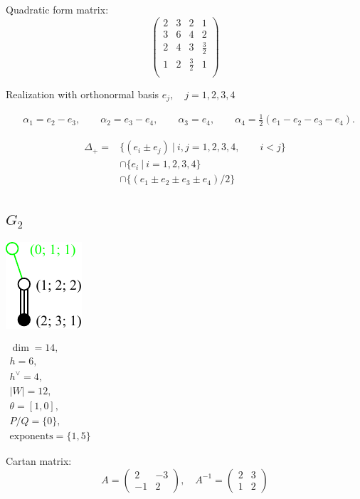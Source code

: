 \documentclass[12pt]{article}
\newcommand{\hc}{h^{\vee}}
\begin{document}
Quadratic form matrix:
\[
\left(
\begin{array}{cccc}
 2& 3 & 2& 1\\
 3 & 6& 4&2 \\
 2 & 4 & 3 & \frac32 \\
 1 &2  & \frac32 &1 \\
\end{array}
\right)
\]

Realization with orthonormal basis $e_j,\quad j=1,2,3,4$

\begin{align*}
  &\alpha_1=e_2-e_3,\qquad
  \alpha_2=e_3-e_4,\qquad
  \alpha_3=e_4,\qquad
  \alpha_4=\frac12(e_1-e_2-e_3-e_4).
\end{align*}

\begin{align*}
 \Delta_{+}=&\{(e_i \pm e_j)\ |\ i,j=1,2,3,4,\qquad i<j\} \\
      &\cap
       \{ e_{i}\ |\ i=1,2,3,4\}\\
      &\cap
       \{ (e_{1}\pm e_2 \pm e_3 \pm e_4)/2\}
\end{align*}
\newpage

%
\subsection*{$G_2$}
\parbox{8cm}{\includegraphics{lie_G2.pdf}}
$
\begin{array}{l}
 \dim = 14, \\
  h= 6,\\
 \hc= 4,\\
 |W|=12,\\
 \theta=[1,0],\\
 P/Q=\{0\},\\
 \text{exponents}={\{1,5\}}
\end{array}
$

Cartan matrix:
\[
A=\left(
\begin{array}{cc}
 2 & -3 \\
 -1& 2
\end{array}
\right),\quad
A^{-1}=\left(
\begin{array}{cc}
 2 & 3 \\
 1& 2
\end{array}
\right)
\]
\end{document}
